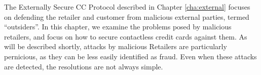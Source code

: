 The Externally Secure CC Protocol described in Chapter \ref{cha:external} focuses on defending the retailer and customer from malicious external parties, termed ``outsiders''.
In this chapter, we examine the problems posed by malicious retailers, and focus on how to secure contactless credit cards against them.
As will be described shortly, attacks by malicious Retailers are particularly pernicious, as they can be less easily identified as fraud.
Even when these attacks are detected, the resolutions are not always simple.
